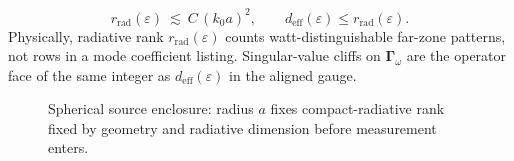 \begin{equation}
\label{eq:ch4.signature-sphere-rank}
r_{\mathrm{rad}}(\varepsilon)\ \lesssim\ C\,(k_0 a)^2,
\qquad
d_{\mathrm{eff}}(\varepsilon)\le r_{\mathrm{rad}}(\varepsilon).
\end{equation}
Physically, radiative rank $r_{\mathrm{rad}}(\varepsilon)$ counts watt-distinguishable far-zone patterns, not rows in a mode coefficient listing. Singular-value cliffs on $\boldsymbol{\Gamma}_\omega$ are the operator face of the same integer as $d_{\mathrm{eff}}(\varepsilon)$ in the aligned gauge. \cite{hansen1988}
\begin{figure}[t]
\centering
{}
\caption{Spherical source enclosure: radius $a$ fixes compact-radiative rank fixed by geometry and radiative dimension before measurement enters.}
\label{fig:ch4.signature-sphere-rank}
\end{figure}
